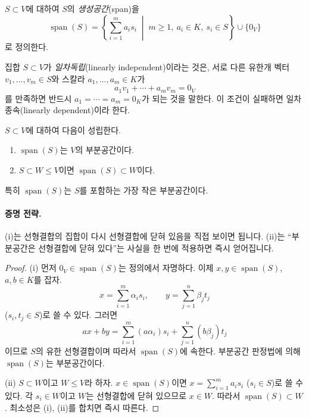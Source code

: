 \begin{definition}
$S\subset V$에 대하여 $S$의 \emph{생성공간}(span)을
\[
\operatorname{span}(S)
=
\left\{
\sum_{i=1}^{m}a_is_i
\;\middle|\;
m\ge 1,\ a_i\in K,\ s_i\in S
\right\}
\cup\{0_V\}
\]
로 정의한다.
\end{definition}

\begin{definition}
집합 $S\subset V$가 \emph{일차독립}(linearly independent)이라는 것은, 서로 다른 유한개 벡터 $v_1,\dots,v_m\in S$와 스칼라 $a_1,\dots,a_m\in K$가
\[
a_1v_1+\cdots+a_mv_m=0_V
\]
를 만족하면 반드시 $a_1=\cdots=a_m=0_K$가 되는 것을 말한다. 이 조건이 실패하면 일차종속(linearly dependent)이라 한다.
\end{definition}

\begin{theorem}
$S\subset V$에 대하여 다음이 성립한다.
\begin{enumerate}[label=(\roman*)]
\item $\operatorname{span}(S)$는 $V$의 부분공간이다.
\item $S\subset W\le V$이면 $\operatorname{span}(S)\subset W$이다.
\end{enumerate}
특히 $\operatorname{span}(S)$는 $S$를 포함하는 가장 작은 부분공간이다.
\end{theorem}

\paragraph{증명 전략.}
(i)는 선형결합의 집합이 다시 선형결합에 닫혀 있음을 직접 보이면 됩니다. (ii)는 ``부분공간은 선형결합에 닫혀 있다''는 사실을 한 번에 적용하면 즉시 얻어집니다.

\begin{proof}
(i) 먼저 $0_V\in\operatorname{span}(S)$는 정의에서 자명하다. 이제 $x,y\in\operatorname{span}(S)$, $a,b\in K$를 잡자.
\[
x=\sum_{i=1}^{m}\alpha_is_i,\qquad
y=\sum_{j=1}^{n}\beta_jt_j
\]
($s_i,t_j\in S$)로 쓸 수 있다. 그러면
\[
ax+by
=
\sum_{i=1}^{m}(a\alpha_i)s_i
+
\sum_{j=1}^{n}(b\beta_j)t_j
\]
이므로 $S$의 유한 선형결합이며 따라서 $\operatorname{span}(S)$에 속한다. 부분공간 판정법에 의해 $\operatorname{span}(S)$는 부분공간이다.

(ii) $S\subset W$이고 $W\le V$라 하자. $x\in\operatorname{span}(S)$이면 $x=\sum_{i=1}^{m}a_is_i$ ($s_i\in S$)로 쓸 수 있다. 각 $s_i\in W$이고 $W$는 선형결합에 닫혀 있으므로 $x\in W$. 따라서 $\operatorname{span}(S)\subset W$.
최소성은 (i), (ii)를 합치면 즉시 따른다.
\end{proof}

